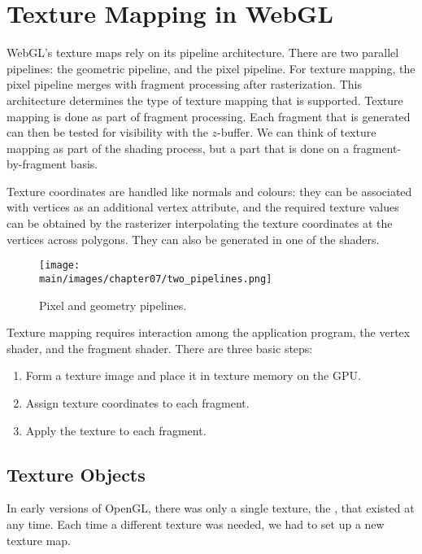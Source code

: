 \documentclass[../COS3712_Notes.tex]{subfiles}
\begin{document}
    \section{Texture Mapping in WebGL}
      WebGL's texture maps rely on its pipeline architecture.
      There are two parallel pipelines: the geometric pipeline, and the pixel pipeline.
      For texture mapping, the pixel pipeline merges with fragment processing after rasterization.
      This architecture determines the type of texture mapping that is supported.
      Texture mapping is done as part of fragment processing.
      Each fragment that is generated can then be tested for visibility with the $z$-buffer.
      We can think of texture mapping as part of the shading process, but a part that is done
      on a fragment-by-fragment basis.

      Texture coordinates are handled like normals and colours:
      they can be associated with vertices as an additional vertex attribute,
      and the required texture values can be obtained by the rasterizer interpolating
      the texture coordinates at the vertices across polygons.
      They can also be generated in one of the shaders.

      \begin{figure}
        \begin{center}
          \texttt{[image: \\main/images/chapter07/two\_pipelines.png]}
        \end{center}
        \caption{Pixel and geometry pipelines.}
      \end{figure}

      Texture mapping requires interaction among the application program, the vertex shader,
      and the fragment shader.
      There are three basic steps:
      \begin{enumerate}
        \item Form a texture image and place it in texture memory on the GPU.
        \item Assign texture coordinates to each fragment.
        \item Apply the texture to each fragment.
      \end{enumerate}

      \subsection{Texture Objects}
        In early versions of OpenGL, there was only a single texture,
        the , that existed at any time.
        Each time a different texture was needed, we had to set up a new texture map.
\end{document}
